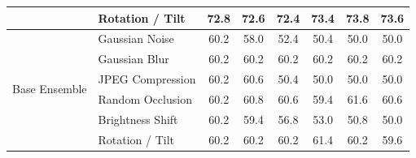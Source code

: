 \documentclass[journal,12pt]{IEEEtran}
\begin{document}
\begin{table}[t]
{\begin{tabular}{llcccccc}
        & Rotation / Tilt    & 72.8 & 72.6 & 72.4 & 73.4 & 73.8 & 73.6 \\
        \midrule
        \multirow{6}{*}{Base Ensemble}
        & Gaussian Noise     & 60.2 & 58.0 & 52.4 & 50.4 & 50.0 & 50.0 \\
        & Gaussian Blur      & 60.2 & 60.2 & 60.2 & 60.2 & 60.2 & 60.2 \\
        & JPEG Compression   & 60.2 & 60.6 & 50.4 & 50.0 & 50.0 & 50.0 \\
        & Random Occlusion   & 60.2 & 60.8 & 60.6 & 59.4 & 61.6 & 60.6 \\
        & Brightness Shift   & 60.2 & 59.4 & 56.8 & 53.0 & 50.8 & 50.0 \\
        & Rotation / Tilt    & 60.2 & 60.2 & 60.2 & 61.4 & 60.2 & 59.6 \\
        \bottomrule
    \end{tabular}
    }
\end{table}
\end{document}
